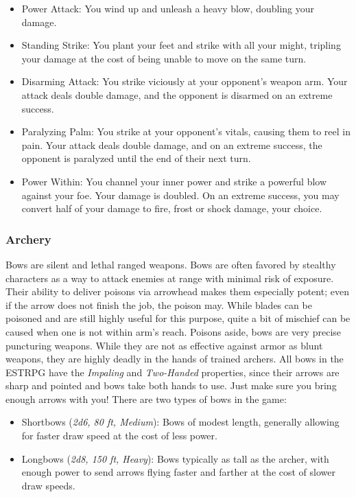 \documentclass[12pt]{book}
\begin{document}
\begin{itemize}
	\item Power Attack: You wind up and unleash a heavy blow, doubling your damage.
	\item Standing Strike: You plant your feet and strike with all your might, tripling your damage at the cost of being unable to move on the same turn.
	\item Disarming Attack: You strike viciously at your opponent's weapon arm. Your attack deals double damage, and the opponent is disarmed on an extreme success.
	\item Paralyzing Palm: You strike at your opponent's vitals, causing them to reel in pain. Your attack deals double damage, and on an extreme success, the opponent is paralyzed until the end of their next turn.
	\item Power Within: You channel your inner power and strike a powerful blow against your foe. Your damage is doubled. On an extreme success, you may convert half of your damage to fire, frost or shock damage, your choice.
\end{itemize}

\subsubsection{Archery}

Bows are silent and lethal ranged weapons. Bows are often favored by stealthy characters as a way to attack enemies at range with minimal risk of exposure. Their ability to deliver poisons via arrowhead makes them especially potent; even if the arrow does not finish the job, the poison may. While blades can be poisoned and are still highly useful for this purpose, quite a bit of mischief can be caused when one is not within arm's reach. Poisons aside, bows are very precise puncturing weapons. While they are not as effective against armor as blunt weapons, they are highly deadly in the hands of trained archers. All bows in the ESTRPG have the \textit{Impaling} and \textit{Two-Handed} properties, since their arrows are sharp and pointed and bows take both hands to use. Just make sure you bring enough arrows with you! There are two types of bows in the game:

\begin{itemize}
	\item Shortbows (\textit{2d6, 80 ft, Medium}): Bows of modest length, generally allowing for faster draw speed at the cost of less power.
	\item Longbows (\textit{2d8, 150 ft, Heavy}): Bows typically as tall as the archer, with enough power to send arrows flying faster and farther at the cost of slower draw speeds.
\end{itemize}
\end{document}

